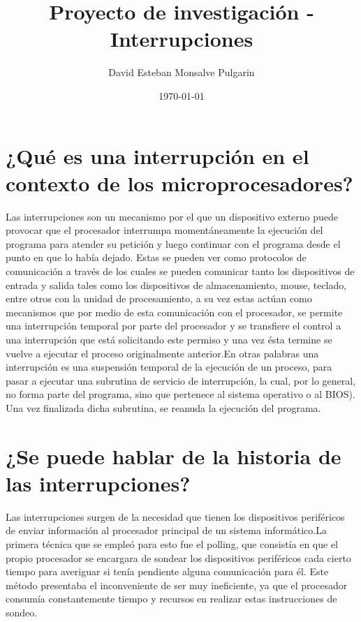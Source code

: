 \documentclass{article}
\title{Proyecto de investigación - Interrupciones}
\author{David Esteban Monsalve Pulgarin}
\date{\today}
\begin{document}
\maketitle

\section{¿Qué es una interrupción en el contexto de los microprocesadores?}

\par
Las interrupciones son un mecanismo por el que un dispositivo externo puede provocar que el procesador interrumpa momentáneamente la ejecución del programa para atender su petición y luego continuar con el programa desde el punto en que lo había dejado. Estas se pueden ver como protocolos de comunicación a través de los cuales se pueden comunicar tanto los dispositivos de entrada y salida tales como los dispositivos de almacenamiento, mouse, teclado, entre otros con la unidad de procesamiento, a su vez estas actúan como mecanismos que por medio de esta comunicación con el procesador, se permite una interrupción temporal por parte del procesador y se transfiere el control a una interrupción que está solicitando este permiso y una vez ésta termine se vuelve a ejecutar el proceso originalmente anterior.En otras palabras una interrupción es una suspensión temporal de la ejecución de un proceso, para pasar a ejecutar una subrutina de servicio de interrupción, la cual, por lo general, no forma parte del programa, sino que pertenece al sistema operativo o al BIOS). Una vez finalizada dicha subrutina, se reanuda la ejecución del programa. 


\section{¿Se puede hablar de la historia de las interrupciones?}
\par
\vspace{5mm}
Las interrupciones surgen de la necesidad que tienen los dispositivos periféricos de enviar información al procesador principal de un sistema informático.La primera técnica que se empleó para esto fue el polling, que consistía en que el propio procesador se encargara de sondear los dispositivos periféricos cada cierto tiempo para averiguar si tenía pendiente alguna comunicación para él. Este método presentaba el inconveniente de ser muy ineficiente, ya que el procesador consumía constantemente tiempo y recursos en realizar estas instrucciones de sondeo.
\end{document}
